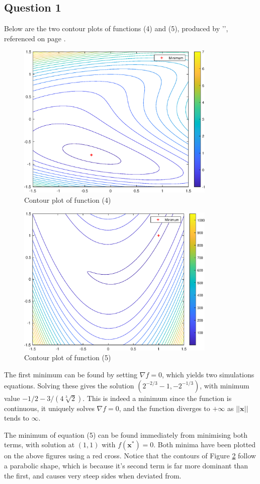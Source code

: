 \documentclass[10pt,a4paper,notitlepage]{article}
\newcommand{\abs}[1]{\lvert#1\rvert}
\newcommand{\x}{\mathbf{x}}
\begin{document}
\subsection*{\centering Question 1}
Below are the two contour plots of functions (4) and (5), produced by '', referenced on page \pageref{cd:0.5}. 
\begin{figure}[H]
\centering
\includegraphics[width=9.5cm]{Image_1}
\caption{Contour plot of function (4)}\label{fg:1}
\end{figure}
\begin{figure}[H]
\centering
\includegraphics[width=9.5cm]{Image_2}
\caption{Contour plot of function (5)}\label{fg:2}
\end{figure}
The first minimum can be found by setting $\nabla f=0$, which yields two simulations equations. Solving these gives the solution $(2^{-2/3}-1,-2^{-1/3})$, with minimum value $-1/2-3/(4\sqrt[3]{2})$. This is indeed a minimum since the function is continuous, it uniquely solves $\nabla f=0$, and the function diverges to $+\infty$ as $\abs{\abs{\x}}$ tends to $\infty$. 

The minimum of equation (5) can be found immediately from minimising both terms, with solution at $(1,1)$ with $f(\x^{*})=0$. Both minima have been plotted on the above figures using a red cross. Notice that the contours of Figure \ref{fg:2} follow a parabolic shape, which is because it's second term is far more dominant than the first, and causes very steep sides when deviated from.
\end{document}
